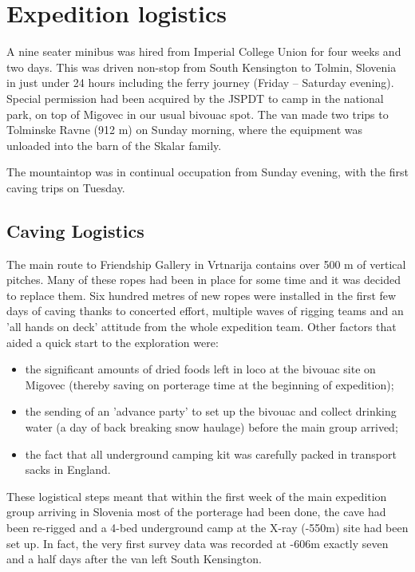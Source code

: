 \section{Expedition logistics}

A nine seater minibus was hired from Imperial College Union for four weeks and two days. 
This was driven
non-stop from South Kensington to Tolmin, Slovenia in just under 24 hours
including the ferry journey (Friday -- Saturday evening). Special permission
had been acquired by the JSPDT to camp in the national park, on top of Migovec
in our usual bivouac spot. The van made two trips to Tolminske Ravne (912 m) on
Sunday morning, where the equipment was unloaded into the barn of the Skalar
family. 

The mountaintop was in continual occupation from Sunday evening, with the first
caving trips on Tuesday.

\subsection{Caving Logistics}

The main route to Friendship Gallery in Vrtnarija contains over 500
m of vertical pitches. Many of these ropes had been in place 
for some time and it was decided to replace them. Six hundred metres of new
ropes were installed in the first few days of caving thanks to concerted
effort, multiple waves of rigging teams and an 'all hands on deck' attitude
from the whole expedition team.  Other factors that aided a quick start to the
exploration were:
\begin{itemize}
\item the significant amounts of dried foods left in loco at the bivouac
site on Migovec (thereby saving on porterage time at the beginning
of expedition); 
\item the sending of an 'advance party' to set up the bivouac and collect
drinking water (a day of back breaking snow haulage) before the main
group arrived; 
\item the fact that all underground camping kit was carefully packed in
transport sacks in England. 
\end{itemize}
These logistical steps meant that within the first week of the main
expedition group arriving in Slovenia most of the porterage had been
done, the cave had been re-rigged and a 4-bed underground camp at
the X-ray (-550m) site had been set up. In fact, the very first survey
data was recorded at -606m exactly seven and a half days after the
van left South Kensington.


